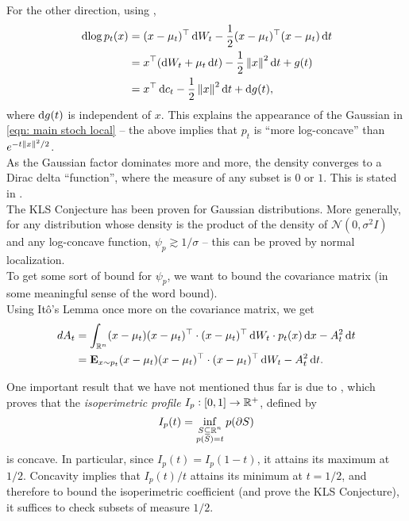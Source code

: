 		For the other direction, using ,
		\begin{align*}
			\d{\log p_t(x)} &= (x-\mu_t)^\top \d{W}_t - \frac{1}{2} (x-\mu_t)^\top (x-\mu_t) \d{t} \\
				&= x^\top (\d{W}_t + \mu_t\d{t}) - \frac{1}{2}\norm{x}^2\d{t} + g(t) \\
				&= x^\top\d{c}_t - \frac{1}{2}\norm{x}^2\d{t} + \d{g}(t),
		\end{align*}
		where $\operatorname{d}\!{g}(t)$ is independent of $x$. This explains the appearance of the Gaussian in \eqref{eqn: main stoch local} -- the above implies that $p_t$ is ``more log-concave'' than $e^{-t\left\lVert x\right\rVert^2/2}$.\\
		As the Gaussian factor dominates more and more, the density converges to a Dirac delta ``function'', where the measure of any subset is $0$ or $1$. This is stated in .\\

		The KLS Conjecture has been proven for Gaussian distributions. More generally, for any distribution whose density is the product of the density of $\mathcal{N}(0,\sigma^2 I)$ and any log-concave function, $\psi_p \gtrsim 1/\sigma$ -- this can be proved by normal localization.\\
		
		To get some sort of bound for $\psi_p$, we want to bound the covariance matrix (in some meaningful sense of the word bound).\\
		Using It\^{o}'s Lemma once more on the covariance matrix, we get 
		\begin{align}
			d{A}_t &= \int_{\mathbb{R}^n} (x-\mu_t)(x-\mu_t)^\top \cdot (x-\mu_t)^\top\operatorname{d}\!{W}_t \cdot p_t(x) \operatorname{d}\!{x} - A_t^2 \operatorname{d}\!{t} \nonumber \\
				&= \textbf{E}_{x \sim p_t} (x-\mu_t)(x-\mu_t)^\top \cdot (x-\mu_t)^\top\operatorname{d}\!{W}_t - A_t^2 \operatorname{d}\!{t}. \label{eqn: dAt expression}
		\end{align}

		One important result that we have not mentioned thus far is due to \cite{milman2008isoperimetricprofile}, which proves that the \textit{isoperimetric profile} $I_p : [0,1]\to\mathbb{R}^+$, defined by
		\[ I_p(t) = \inf_{\substack{S\subseteq\mathbb{R}^n \\ p(S) = t}} p(\partial S) \]
		is concave. In particular, since $I_p(t) = I_p(1-t)$, it attains its maximum at $1/2$. Concavity implies that $I_p(t)/t$ attains its minimum at $t = 1/2$, and therefore to bound the isoperimetric coefficient (and prove the KLS Conjecture), it suffices to check subsets of measure $1/2$.\\

